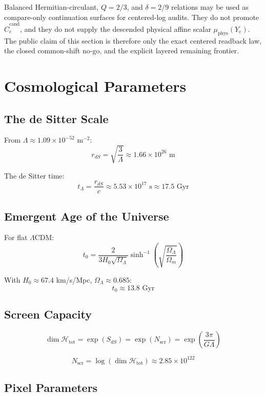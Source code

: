 Balanced Hermitian-circulant, \(Q=2/3\), and \(\delta=2/9\) relations may be used as compare-only continuation surfaces for centered-log audits. They do not promote \(\widehat C_e^{\mathrm{cand}}\), and they do not supply the descended physical affine scalar \(\mu_{\mathrm{phys}}(Y_e)\). The public claim of this section is therefore only the exact centered readback law, the closed common-shift no-go, and the explicit layered remaining frontier.

\section{Cosmological Parameters}\label{14-cosmological-parameters}

\subsection{The de Sitter Scale}\label{141-the-de-sitter-scale}

From \(\Lambda \approx 1.09 \times 10^{-52}\) m\(^{-2}\): \[r_{dS} = \sqrt{\frac{3}{\Lambda}} \approx 1.66 \times 10^{26} \text{ m}\]

The de Sitter time: \[t_\Lambda = \frac{r_{dS}}{c} \approx 5.53 \times 10^{17} \text{ s} \approx 17.5 \text{ Gyr}\]

\subsection{Emergent Age of the Universe}\label{142-emergent-age-of-the-universe}

For flat \ensuremath{\Lambda}CDM: \[t_0 = \frac{2}{3H_0\sqrt{\Omega_\Lambda}} \sinh^{-1}\left(\sqrt{\frac{\Omega_\Lambda}{\Omega_m}}\right)\]

With \(H_0 \approx 67.4\) km/s/Mpc, \(\Omega_\Lambda \approx 0.685\): \[t_0 \approx 13.8 \text{ Gyr}\]

\subsection{Screen Capacity}\label{143-screen-capacity}

\[\dim \mathcal{H}_{\text{tot}} = \exp(S_{dS}) = \exp(N_{\mathrm{scr}}) = \exp\left(\frac{3\pi}{G\Lambda}\right)\]

\[N_{\mathrm{scr}} = \log(\dim \mathcal{H}_{\text{tot}}) \approx 2.85 \times 10^{122}\]

\subsection{Pixel Parameters}\label{144-pixel-parameters}

